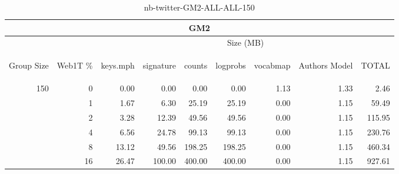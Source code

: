 \begin{center}
\begin{table}[htbp]
\begin{tabular}{ | r | r | r | r | r | r | r | r | r |}
\hline
\multicolumn{9}{|c|}{GM2}\\
\hline
 & & \multicolumn{7}{|c|}{Size (MB)}\\ \cline{3-9}
\begin{sideways}Group Size\end{sideways} & \begin{sideways}Web1T \% \end{sideways} & \begin{sideways}keys.mph\end{sideways} & \begin{sideways}signature\end{sideways} & \begin{sideways}counts\end{sideways} & \begin{sideways}logprobs\end{sideways} & \begin{sideways}vocabmap\end{sideways} & \begin{sideways}Authors Model \end{sideways} & \begin{sideways}TOTAL\end{sideways}\\
\hline
\multirow{5}{*}{150}
 & 0 & 0.00 & 0.00 & 0.00 & 0.00 & 1.13 & 1.33 & 2.46\\ \cline{2-9}
 & 1 & 1.67 & 6.30 & 25.19 & 25.19 & 0.00 & 1.15 & 59.49\\ \cline{2-9}
 & 2 & 3.28 & 12.39 & 49.56 & 49.56 & 0.00 & 1.15 & 115.95\\ \cline{2-9}
 & 4 & 6.56 & 24.78 & 99.13 & 99.13 & 0.00 & 1.15 & 230.76\\ \cline{2-9}
 & 8 & 13.12 & 49.56 & 198.25 & 198.25 & 0.00 & 1.15 & 460.34\\ \cline{2-9}
 & 16 & 26.47 & 100.00 & 400.00 & 400.00 & 0.00 & 1.15 & 927.61\\ \cline{2-9}
\hline
\end{tabular}
\caption{nb-twitter-GM2-ALL-ALL-150}
\label{table:nb-twitter-GM2-ALL-ALL-150}
\end{table}
\end{center}

